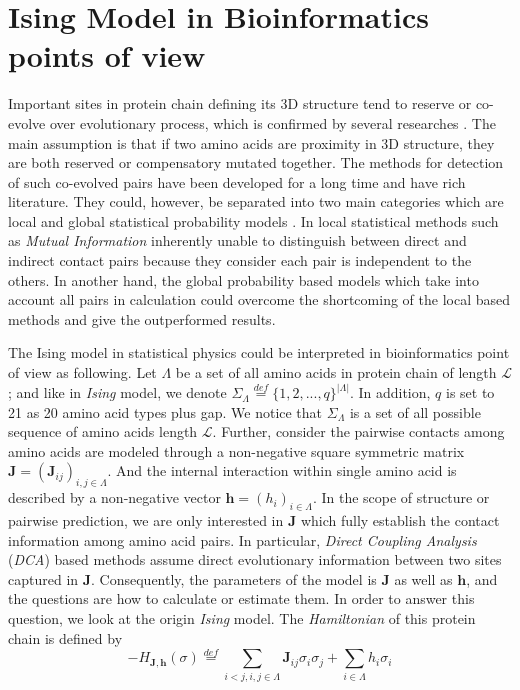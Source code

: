 \documentclass[a4paper,12pt]{article}
\begin{document}
\section{Ising Model in Bioinformatics points of view}
Important sites in protein chain defining its 3D structure tend to reserve or co-evolve over evolutionary process, which is confirmed by several researches \cite{Marks11,Hopf14,Ekeberg13}. The main assumption is that if two amino acids are proximity in 3D structure, they are both reserved or compensatory mutated together. The methods for detection of such co-evolved pairs have been developed for a long time and have rich literature. They could, however, be separated into two main categories which are local and global statistical probability models \cite{Marks12}. In local statistical methods such as \emph{Mutual Information} inherently unable to distinguish between direct and indirect contact pairs because they consider each pair is independent to the others. In another hand, the global probability based models which take into account all pairs in calculation could overcome the shortcoming of the local based methods and give the outperformed results. 
\[\]

The Ising model in statistical physics could be interpreted in bioinformatics point of view as following. Let $\Lambda$ be a set of all amino acids in protein chain of length $ \mathcal{L} $; and like in \emph{Ising} model, we denote $ \Sigma_\Lambda \stackrel{def}{=}\{ 1,2,...,q\}^{| \Lambda |}$. In addition, $ q $ is set to 21 as 20 amino acid types plus gap. We notice that $ \Sigma_\Lambda$ is a set of all possible sequence of amino acids length $ \mathcal{L} $. Further, consider the pairwise contacts among amino acids are modeled through a non-negative square symmetric matrix $ \mathbf{J} = \left( \mathbf{J}_{ij} \right)_{i,j \in \Lambda} $. And the internal interaction within single amino acid is described by a non-negative vector $ \mathbf{h} = (h_i)_{i \in \Lambda} $. In the scope of structure or pairwise prediction, we are only interested in $\mathbf{J}$ which fully establish the contact information among amino acid pairs. In particular, \emph{Direct Coupling Analysis} (\emph{DCA}) based methods assume direct evolutionary information between two sites captured in $\mathbf{J}$. Consequently, the parameters of the model is $\mathbf{J}$ as well as \( \mathbf{h}\), and the questions are how to calculate or estimate them. In order to answer this question, we look at the origin \emph{Ising} model. The \emph{Hamiltonian} of this protein chain is defined by
\begin{equation} \label{eq4}
 -H_{\mathbf{J},\mathbf{h}}(\sigma) \stackrel{def}{=}  \sum_{ i<j, i,j \in \Lambda} \mathbf{J}_{ij}\sigma_i \sigma_j + \sum_{i \in \Lambda} h_i \sigma_i 
\end{equation}
\end{document}
